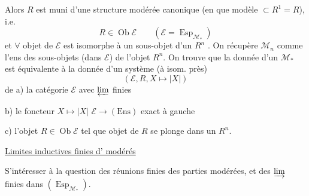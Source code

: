 Alors $R$ est muni d'une structure modérée canonique (en  que modèle $\subset R^1=R$), i.e.
\[
 R\in\operatorname{Ob}\mathcal E\qquad(\mathcal E=\operatorname{Esp}_{\mathcal M_*})
\]
et $\forall$ objet de $\mathcal E$ est isomorphe à un sous-objet d'un $R^n$ . On récupère $\mathcal M_n$ comme l'ens des  sous-objets (dans $\mathcal E$) de l'objet $R^n$. On trouve que la donnée d'un $\mathcal M_*$ est équivalente à la donnée d'un système (à isom. près)
\[
 (\mathcal E,R,X\longmapsto |X|)
\]
de a) la catégorie $\mathcal E$ avec $\varprojlim$ finies

b) le foncteur $X\mapsto |X|$ $\mathcal E\longrightarrow(\mathrm{Ens})$ exact à gauche

c) l'objet $R\in\operatorname{Ob}\mathcal E$ tel que  objet de $R$ se plonge dans un $R^n$.



\uline{Limites inductives finies d' modérés}

S'intéresser à la question des réunions finies des parties modérées, et des $\varinjlim$ finies dans $(\operatorname{Esp}_{\mathcal M_*})$.

